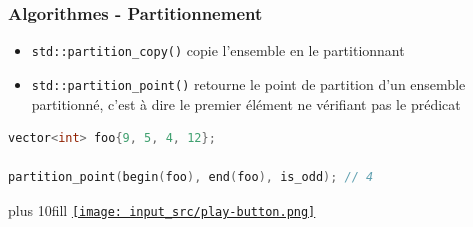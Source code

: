 \documentclass[C++.tex]{subfiles}
\begin{document}
\begin{frame}[fragile]
	\frametitle{Algorithmes - Partitionnement}
	\begin{itemize}
		\item \lstinline|std::partition_copy()| copie l'ensemble en le partitionnant
		\item \lstinline|std::partition_point()| retourne le point de partition d'un ensemble partitionné, c'est à dire le premier élément ne vérifiant pas le prédicat
	\end{itemize}

	\begin{lstlisting}[language=C++]
vector<int> foo{9, 5, 4, 12};

partition_point(begin(foo), end(foo), is_odd); // 4\end{lstlisting}

	\vskip 10mm plus 10fill
	\hfill
	\href{https://godbolt.org/#g:!((g:!((g:!((h:codeEditor,i:(filename:'1',fontScale:14,fontUsePx:'0',j:1,lang:c%2B%2B,selection:(endColumn:1,endLineNumber:33,positionColumn:1,positionLineNumber:33,selectionStartColumn:1,selectionStartLineNumber:33,startColumn:1,startLineNumber:33),source:'%23include+%3Ciostream%3E%0A%23include+%3Cvector%3E%0A%23include+%3Calgorithm%3E%0A%0Ausing+std::begin%3B%0Ausing+std::end%3B%0A%0Astatic+bool+is_odd(int+i)%0A%7B%0A++return+(i%252)%3D%3D1%3B%0A%7D%0A%0Aint+main()%0A%7B%0A++%7B%0A++++std::vector%3Cint%3E+foo%7B4,+5,+9,+12%7D%3B%0A%0A++++std::cout+%3C%3C+std::boolalpha+%3C%3C+std::is_partitioned(begin(foo),+end(foo),+is_odd)+%3C%3C+!'%5Cn!'%3B%0A++%7D%0A%0A++%7B%0A++++std::vector%3Cint%3E+foo%7B9,+5,+4,+12%7D%3B%0A%0A++++std::cout+%3C%3C+std::boolalpha+%3C%3C+std::is_partitioned(begin(foo),+end(foo),+is_odd)+%3C%3C+!'%5Cn!'%3B%0A++%7D%0A%0A++%7B%0A++++std::vector%3Cint%3E+foo%7B9,+5,+4,+12%7D%3B%0A%0A++++std::cout+%3C%3C+*std::partition_point(begin(foo),+end(foo),+is_odd)+%3C%3C+!'%5Cn!'%3B%0A++%7D%0A%7D%0A'),l:'5',n:'0',o:'C%2B%2B+source+%231',t:'0')),k:50,l:'4',n:'0',o:'',s:0,t:'0'),(g:!((h:executor,i:(argsPanelShown:'1',compilationPanelShown:'0',compiler:g112,compilerOutShown:'0',execArgs:'',execStdin:'',fontScale:14,fontUsePx:'0',j:1,lang:c%2B%2B,libs:!((name:boost,ver:'175')),options:'-std%3Dc%2B%2B11',source:1,stdinPanelShown:'1',tree:'1',wrap:'0'),l:'5',n:'0',o:'Executor+x86-64+gcc+11.2+(C%2B%2B,+Editor+%231)',t:'0')),header:(),k:50,l:'4',n:'0',o:'',s:0,t:'0')),l:'2',n:'0',o:'',t:'0')),version:4}{\texttt{[image: input\_src/play-button.png]}}
\end{frame}
\end{document}
